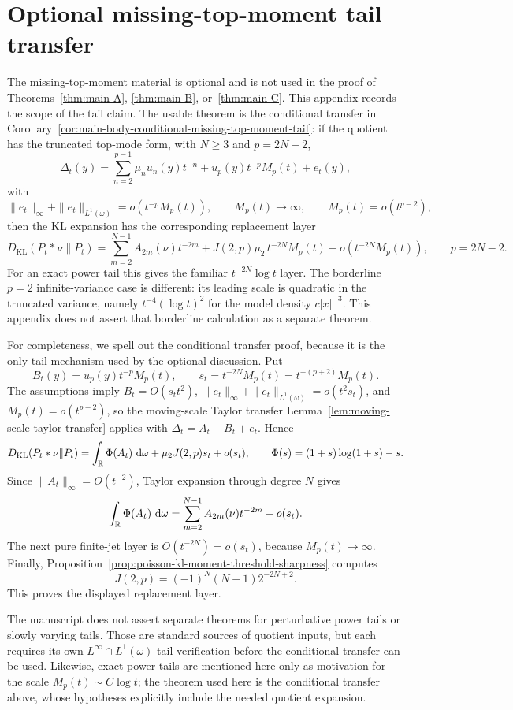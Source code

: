 \section{Optional missing-top-moment tail transfer}%
\label{app:conditional-missing-top-moment-tails}

The missing-top-moment material is optional and is not used in the proof of
Theorems~\ref{thm:main-A}, \ref{thm:main-B}, or~\ref{thm:main-C}.  This
appendix records the scope of the tail claim.  The usable theorem
is the conditional transfer in
Corollary~\ref{cor:main-body-conditional-missing-top-moment-tail}: if the
quotient has the truncated top-mode form, with \(N\ge3\) and \(p=2N-2\),
\[
\Delta_t(y)=
\sum_{n=2}^{p-1}\mu_nu_n(y)t^{-n}
+u_p(y)t^{-p}M_p(t)+e_t(y),
\]
with
\[
\|e_t\|_\infty+\|e_t\|_{L^1(\omega)}=o(t^{-p}M_p(t)),
\qquad
M_p(t)\to\infty,\qquad
M_p(t)=o(t^{p-2}),
\]
then the KL expansion has the corresponding replacement layer
\[
D_{\mathrm{KL}}(P_t*\nu\|P_t)
=
\sum_{m=2}^{N-1}A_{2m}(\nu)t^{-2m}
+J(2,p)\mu_2\,t^{-2N}M_p(t)
+o(t^{-2N}M_p(t)),
\qquad p=2N-2.
\]
For an exact power tail this gives the familiar \(t^{-2N}\log t\) layer.
The borderline \(p=2\) infinite-variance case is different: its leading scale
is quadratic in the truncated variance, namely \(t^{-4}(\log t)^2\) for the
model density \(c|x|^{-3}\).  This appendix does not assert that borderline
calculation as a separate theorem.

For completeness, we spell out the conditional transfer proof, because it is
the only tail mechanism used by the optional discussion.  Put
\[
B_t(y)=u_p(y)t^{-p}M_p(t),\qquad
s_t=t^{-2N}M_p(t)=t^{-(p+2)}M_p(t).
\]
The assumptions imply \(B_t=O(s_t t^2)\),
\(\|e_t\|_\infty+\|e_t\|_{L^1(\omega)}=o(t^2s_t)\), and
\(M_p(t)=o(t^{p-2})\), so the moving-scale Taylor transfer
Lemma~\ref{lem:moving-scale-taylor-transfer} applies with
\(\Delta_t=A_t+B_t+e_t\).  Hence
\[
  D_{\mathrm{KL}}(P_t*\nu\|P_t)
  =\int_{\mathbb{R}}\Phi(A_t)\,\,\mathrm{d}\omega+\mu_2J(2,p)s_t+o(s_t),
  \qquad
  \Phi(s)=(1+s)\log(1+s)-s .
\]
Since \(\|A_t\|_\infty=O(t^{-2})\), Taylor expansion through degree \(N\)
gives
\[
  \int_{\mathbb{R}}\Phi(A_t)\,\,\mathrm{d}\omega
  =
  \sum_{m=2}^{N-1}A_{2m}(\nu)t^{-2m}+o(s_t).
\]
The next pure finite-jet layer is \(O(t^{-2N})=o(s_t)\), because
\(M_p(t)\to\infty\).  Finally,
Proposition~\ref{prop:poisson-kl-moment-threshold-sharpness} computes
\[
J(2,p)=(-1)^N(N-1)2^{-2N+2}.
\]
This proves the displayed replacement layer.

The manuscript does not assert separate theorems for perturbative
power tails or slowly varying tails.  Those are standard sources of quotient
inputs, but each requires its own \(L^\infty\cap L^1(\omega)\) tail
verification before the conditional transfer can be used.  Likewise, exact
power tails are mentioned here only as motivation for the scale
\(M_p(t)\sim C\log t\); the theorem used here is the conditional transfer
above, whose hypotheses explicitly include the needed quotient expansion.
